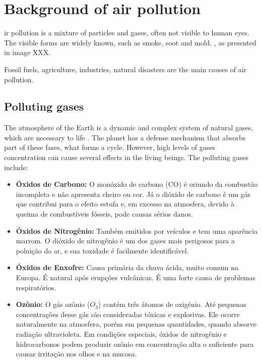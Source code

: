 \section{Background of air pollution}
\label{sec:background}

ir pollution is a mixture of particles and gases, often not visible to human
eyes. The visible forms are widely known, such as smoke, soot and mold.
, as presented in image XXX.  

Fossil fuels, agriculture, industries, natural disasters are the main
    causes of air pollution. 


\subsection{Polluting gases}

The atmosphere of the Earth is a dynamic and complex system of natural gases,
which are necessary to life \cite{gases}. The planet has a
defense mechanism that absorbs part of these fases, what forms a cycle.
However, high levels of gases concentration can cause several effects in the
living beings. The polluting gases include: 

\begin{itemize}
    \item \textbf{Óxidos de Carbono:} O monóxido de carbono (CO) é oriundo da
    combustão incompleta e não apresenta cheiro ou cor. Já o dióxido de
    carbono é um gás que contribui para o efeito estufa e, em excesso na
    atmosfera, devido à queima de combustíveis fósseis, pode causas sérios
    danos.  
    \item \textbf{Óxidos de Nitrogênio:} Também emitidos por veículos e
    tem uma aparência marrom. O dióxido de nitrogênio é um dos gases mais
    perigosos para a poluição do ar, e sua toxidade é facilmente
    identificável. 
    \item \textbf{Óxidos de Enxofre:} Causa primária da chuva ácida, muito
    comum na Europa. É natural após erupções vulcânicas. É uma forte causa de
    problemas respiratórios. 
    \item \textbf{Ozônio:} O gás ozônio ($O_3$) contém três átomos de oxigênio. Até pequenas
    concentrações desse gás são consideradas tóxicas e explosivas. Ele ocorre
    naturalmente na atmosfera, porém em pequenas quantidades, quando absorve
    radiação ultravioleta. Em condições especiais, óxidos de nitrogênio e
    hidrocarbonos podem produzir ozônio em concentração alta o suficiente para
    causar irritação nos olhos e na mucosa. 
\end{itemize}


